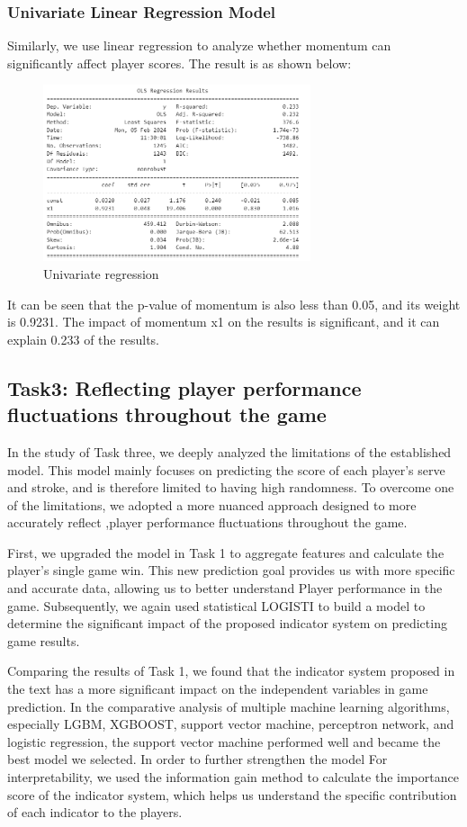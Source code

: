\documentclass{article}
\begin{document}
\subsubsection{Univariate Linear Regression Model}
Similarly, we use linear regression to analyze whether momentum can significantly affect player scores. The result is as shown below:
\begin{figure}[H]
      \centering
      \includegraphics[width=0.7\textwidth]{Univariate_linear_regression.png}
      \caption{Univariate regression}
\end{figure}
It can be seen that the p-value of momentum is also less than 0.05, and its weight is 0.9231. The impact of momentum x1 on the results is significant, and it can explain 0.233 of the results.

\subsection{Task3: Reflecting player performance fluctuations throughout the game}
In the study of Task three, we deeply analyzed the limitations of the established model. This model mainly focuses on predicting the score of each player's serve and stroke, and is therefore limited to having high randomness. To overcome one of the limitations, we adopted a more nuanced approach designed to more accurately reflect ,player performance fluctuations throughout the game.

First, we upgraded the model in Task 1 to aggregate features and calculate the player's single game win. This new prediction goal provides us with more specific and accurate data, allowing us to better understand Player performance in the game. Subsequently, we again used statistical LOGISTI to build a model to determine the significant impact of the proposed indicator system on predicting game results.

Comparing the results of Task 1, we found that the indicator system proposed in the text has a more significant impact on the independent variables in game prediction. In the comparative analysis of multiple machine learning algorithms, especially LGBM, XGBOOST, support vector machine, perceptron network, and logistic regression, the support vector machine performed well and became the best model we selected. In order to further strengthen the model For interpretability, we used the information gain method to calculate the importance score of the indicator system, which helps us understand the specific contribution of each indicator to the players.
\end{document}
